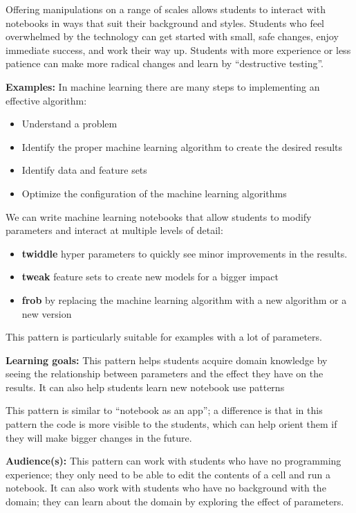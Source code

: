 \documentclass[]{book}
\providecommand{\tightlist}{%
  \setlength{\itemsep}{0pt}\setlength{\parskip}{0pt}}
\begin{document}
Offering manipulations on a range of scales allows students to interact with notebooks
in ways that suit their background and styles. Students who feel overwhelmed by the
technology can get started with small, safe changes, enjoy immediate success, and
work their way up. Students with more experience or less patience can make more
radical changes and learn by ``destructive testing''.

\textbf{Examples:}
In machine learning there are many steps to implementing an effective algorithm:

\begin{itemize}
\tightlist
\item
  Understand a problem
\item
  Identify the proper machine learning algorithm to create the desired results
\item
  Identify data and feature sets
\item
  Optimize the configuration of the machine learning algorithms
\end{itemize}

We can write machine learning notebooks that allow students to modify parameters
and interact at multiple levels of detail:

\begin{itemize}
\tightlist
\item
  \textbf{twiddle} hyper parameters to quickly see minor improvements in the results.
\item
  \textbf{tweak} feature sets to create new models for a bigger impact
\item
  \textbf{frob} by replacing the machine learning algorithm with a new algorithm
  or a new version
\end{itemize}

This pattern is particularly suitable for examples with a lot of parameters.

\textbf{Learning goals:}
This pattern helps students acquire domain knowledge by seeing the relationship
between parameters and the effect they have on the results. It can also help students
learn new notebook use patterns

This pattern is similar to ``notebook as an app''; a difference is that in this
pattern the code is more visible to the students, which can help orient them if
they will make bigger changes in the future.

\textbf{Audience(s):}
This pattern can work with students who have no programming experience; they only
need to be able to edit the contents of a cell and run a notebook. It can also work
with students who have no background with the domain; they can learn about the domain
by exploring the effect of parameters.
\end{document}

